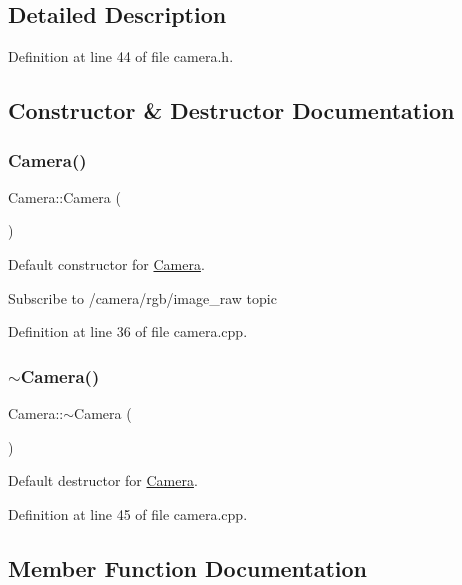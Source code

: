 \subsection{Detailed Description}


Definition at line 44 of file camera.\+h.



\subsection{Constructor \& Destructor Documentation}
\mbox{\label{class_camera_a01f94c3543f56ede7af49dc778f19331}} 
\subsubsection{\texorpdfstring{Camera()}{Camera()}}
{\footnotesize\ttfamily Camera\+::\+Camera (\begin{DoxyParamCaption}{ }\end{DoxyParamCaption})}



Default constructor for \mbox{\hyperlink{class_camera}{Camera}}. 

Subscribe to /camera/rgb/image\+\_\+raw topic 

Definition at line 36 of file camera.\+cpp.

\mbox{\label{class_camera_ad1897942d0ccf91052386388a497349f}} 
\subsubsection{\texorpdfstring{$\sim$\+Camera()}{~Camera()}}
{\footnotesize\ttfamily Camera\+::$\sim$\+Camera (\begin{DoxyParamCaption}{ }\end{DoxyParamCaption})}



Default destructor for \mbox{\hyperlink{class_camera}{Camera}}. 



Definition at line 45 of file camera.\+cpp.



\subsection{Member Function Documentation}
\mbox{\label{class_camera_a0b67f2af6df1296fb25f3b0e160cc99f}} 
